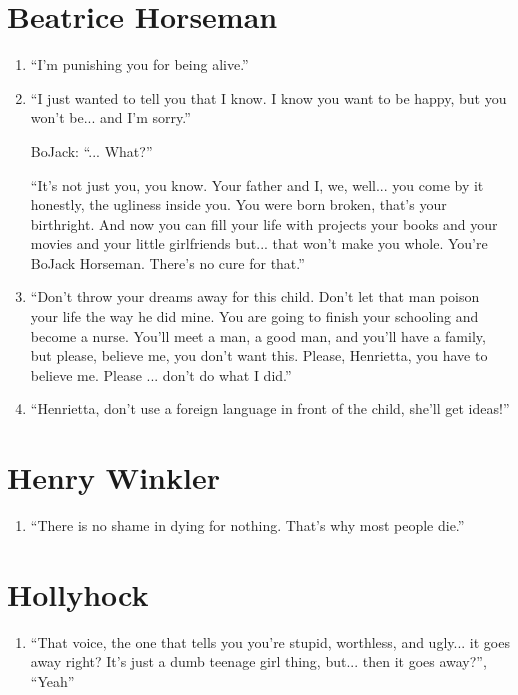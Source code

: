 \documentclass{book}
\numberwithin{equation}{section}
\begin{document}
\section{Beatrice Horseman}
\begin{enumerate}
    \item ``I'm punishing you for being alive.''
    \item ``I just wanted to tell you that I know. I know you want to be happy, but you won't be... and I'm sorry.''
    
    BoJack: ``... What?''
    
    ``It's not just you, you know. Your father and I, we, well... you come by it honestly, the ugliness inside you. You were born broken, that's your birthright. And now you can fill your life with projects your books and your movies and your little girlfriends but... that won't make you whole. You're BoJack Horseman. There's no cure for that.''
    \item ``Don't throw your dreams away for this child. Don't let that man poison your life the way he did mine. You are going to finish your schooling and become a nurse. You'll meet a man, a good man, and you'll have a family, but please, believe me, you don't want this. Please, Henrietta, you have to believe me. Please ... don't do what I did.''
    \item ``Henrietta, don't use a foreign language in front of the child, she'll get ideas!''
\end{enumerate}

\section{Henry Winkler}
\begin{enumerate}
    \item ``There is no shame in dying for nothing. That's why most people die.''
\end{enumerate}

\section{Hollyhock}
\begin{enumerate}
    \item ``That voice, the one that tells you you're stupid, worthless, and ugly... it goes away right? It's just a dumb teenage girl thing, but... then it goes away?'', ``Yeah''
\end{enumerate}
\end{document}
